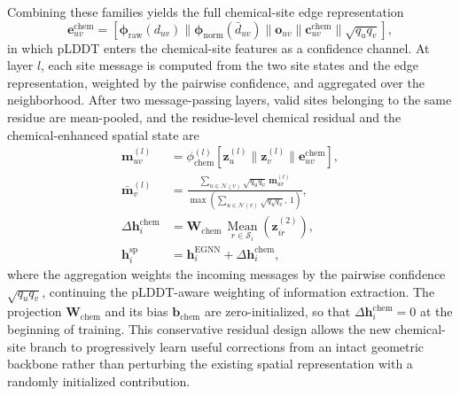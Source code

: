\documentclass[12pt]{article}
\begin{document}
Combining these families yields the full chemical-site edge representation
\begin{equation}
    \mathbf e_{uv}^{\mathrm{chem}} = \left[\boldsymbol\phi_{\mathrm{raw}}
    (d_{uv}) \parallel \boldsymbol\phi_{\mathrm{norm}}(\bar{d}_{uv})
    \parallel \mathbf o_{uv} \parallel \mathbf c_{uv}^{\mathrm{chem}}
    \parallel \sqrt{q_u q_v}\right],
    \label{eq:site_edge}
\end{equation}
in which pLDDT enters the chemical-site features as a confidence channel. At
layer $l$, each site message is computed from the two site states and the
edge representation, weighted by the pairwise confidence, and aggregated over
the neighborhood. After two message-passing layers, valid sites belonging to
the same residue are mean-pooled, and the residue-level chemical residual and
the chemical-enhanced spatial state are
\begin{equation}
    \begin{aligned}
        \mathbf m_{uv}^{(l)} &= \phi_{\mathrm{chem}}^{(l)}
        \left[\mathbf z_u^{(l)} \parallel \mathbf z_v^{(l)}
        \parallel \mathbf e_{uv}^{\mathrm{chem}}\right],\\
        \bar{\mathbf m}_v^{(l)} &= \frac{\sum_{u \in \mathcal{N}(v)}
        \sqrt{q_u q_v}\, \mathbf m_{uv}^{(l)}}
        {\max\!\left(\sum_{u \in \mathcal{N}(v)} \sqrt{q_u q_v},\, 1\right)},\\
        \Delta \mathbf h_i^{\mathrm{chem}} &= \mathbf W_{\mathrm{chem}}\,
        \underset{r \in \mathcal{S}_i}{\operatorname{Mean}}
        \left(\mathbf z_{ir}^{(2)}\right),\\
        \mathbf h_i^{\mathrm{sp}} &= \mathbf h_i^{\mathrm{EGNN}} +
        \Delta \mathbf h_i^{\mathrm{chem}},
    \end{aligned}
    \label{eq:chem_residual}
\end{equation}
where the aggregation weights the incoming messages by the pairwise
confidence $\sqrt{q_u q_v}$, continuing the pLDDT-aware weighting of
information extraction. The projection $\mathbf W_{\mathrm{chem}}$ and its
bias $\mathbf b_{\mathrm{chem}}$ are zero-initialized, so that
$\Delta \mathbf h_i^{\mathrm{chem}} = 0$ at the beginning of training. This
conservative residual design allows the new chemical-site branch to
progressively learn useful corrections from an intact geometric backbone
rather than perturbing the existing spatial representation with a randomly
initialized contribution.
\end{document}
